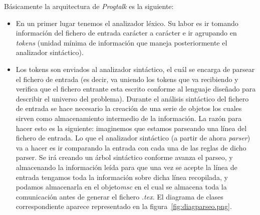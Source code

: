 Básicamente la arquitectura de \textit{Progtalk} es la siguiente:
\begin{itemize}
\item En un primer lugar tenemos el analizador léxico. Su labor es ir
  tomando información del fichero de entrada carácter a carácter e ir
  agrupando en \textit{tokens} (unidad mínima de información que
  maneja posteriormente el analizador sintáctico).
\item Los tokens son enviados al analizador sintáctico, el cuál se
  encarga de parsear el fichero de entrada (es decir, va uniendo los
  tokens que va recibiendo y verifica que el fichero entrante esta
  escrito conforme al lenguaje diseñado para describir el universo del
  problema).  Durante el análisis sintáctico del fichero de entrada se
  hace necesario la creación de una serie de objetos los cuales sirven
  como almacenamiento intermedio de la información. La razón para
  hacer esto es la siguiente: imaginemos que estamos parseando una
  línea del fichero de entrada. Lo que el analizador sintáctico (a
  partir de ahora \textit{parser}) va a hacer es ir comparando la
  entrada con cada una de las reglas de dicho parser. Se irá creando
  un árbol sintáctico conforme avanza el parseo, y almacenando la
  información leída para que una vez se acepte la línea de entrada
  tengamos toda la información sobre dicha línea recopilada, y podamos
  almacenarla en el objeto\textit{msc} en el cual se almacena toda la
  comunicación antes de generar el fichero \textit{.tex}. El diagrama
  de clases correspondiente aparece representado en la
  figura~\ref{fig:diagparseo.png}.


\end{itemize}
